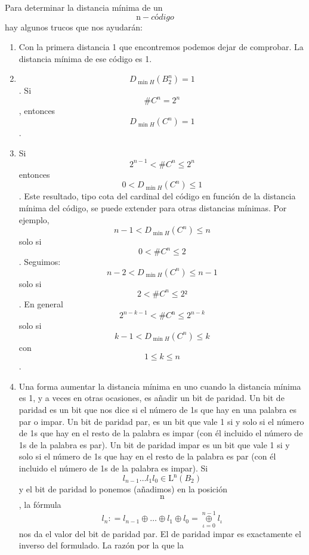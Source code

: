 \begin{enumerate}
\begin{enumerate}
\begin{enumerate}
      Para determinar la distancia mínima de un
      \[\mathtt{\mathrm{n}} - \mathit{código}\]hay algunos trucos que
      nos ayudarán:

      \begin{enumerate}
      \def\labelenumiv{\arabic{enumiv}.}
      \item
        Con la primera distancia 1 que encontremos podemos dejar de
        comprobar. La distancia mínima de ese código es 1.
      \item
        \[D_{\min H}{\left( B_{2}^{n} \right) = 1}\].
        Si\[\#{C^{n} = 2^{n}}\], entonces
        \[D_{\min H}{\left( C^{n} \right) = 1}\].
      \item
        Si \[{2^{n - 1} < \#}{C^{n} \leq 2^{n}}\] entonces
        \[{0 < D_{\min H}}{\left( C^{n} \right) \leq 1}\]. Este
        resultado, tipo cota del cardinal del código en función de la
        distancia mínima del código, se puede extender para otras
        distancias mínimas. Por
        ejemplo,\[{{n - 1} < D_{\min H}}{\left( C^{n} \right) \leq n}\]solo
        si \[{0 < {\# C^{n}}} \leq 2\].
        Seguimos:\[{{n - 2} < D_{\min H}}{\left( C^{n} \right) \leq {n - 1}}\]solo
        si\[{2 < {\# C^{n}}} \leq 2²\]. En general
        \[{2^{{n - k} - 1} < \#}{C^{\mathtt{\mathrm{n}}} \leq 2^{n - k}}\]
        solo si \[{{k - 1} < D_{\min H}}{\left( C^{n} \right) \leq k}\]
        con \[{1 \leq k} \leq n\].
      \item
        Una forma aumentar la distancia mínima en uno cuando la
        distancia mínima es 1, y a veces en otras ocasiones, es añadir
        un bit de paridad. Un bit de paridad es un bit que nos dice si
        el número de 1s que hay en una palabra es par o impar. Un bit de
        paridad par, es un bit que vale 1 si y solo si el número de 1s
        que hay en el resto de la palabra es impar (con él incluido el
        número de 1s de la palabra es par). Un bit de paridad impar es
        un bit que vale 1 si y solo si el número de 1s que hay en el
        resto de la palabra es par (con él incluido el número de 1s de
        la palabra es impar). Si
        \[{l_{n - 1}\ldots l_{1}l_{0}} \in {\mathtt{\mathrm{L}}^{\mathtt{\mathrm{n}}}\left( B_{2} \right)}\]y
        el bit de paridad lo ponemos (añadimos) en la posición
        \[\mathtt{\mathrm{n}}\], la fórmula
        \[l_{n}{: = l_{n - 1}} \oplus \ldots \oplus l_{1} \oplus {l_{0} = \underset{\iota = 0}{\overset{n - 1}{\oplus}}}l_{\iota}\]
        nos da el valor del bit de paridad par. El de paridad impar es
        exactamente el inverso del formulado. La ra\-zón por la que la

\end{enumerate}
\end{enumerate}
\end{enumerate}
\end{enumerate}
